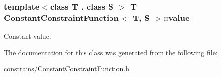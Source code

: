 \subsubsection[{\texorpdfstring{value}{value}}]{\setlength{\rightskip}{0pt plus 5cm}template$<$class T , class S $>$ T {\bf Constant\+Constraint\+Function}$<$ T, S $>$\+::value\hspace{0.3cm}{\ttfamily [private]}}\hypertarget{class_constant_constraint_function_a9f5066596e6c190c36e7cd9cae09f235}{}\label{class_constant_constraint_function_a9f5066596e6c190c36e7cd9cae09f235}
Constant value. 

The documentation for this class was generated from the following file\+:\begin{DoxyCompactItemize}
\item 
constrains/Constant\+Constraint\+Function.\+h\end{DoxyCompactItemize}
